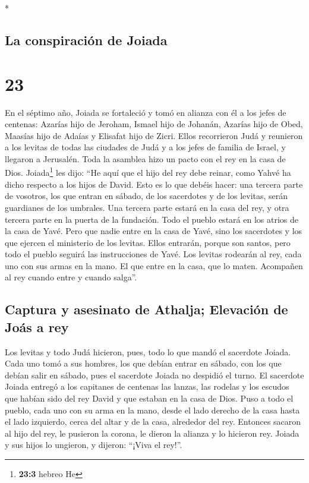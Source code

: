 \begin{paracol}{2}
\begin{otherlanguage}{english}
\end{otherlanguage}

\switchcolumn[0]*

\hypertarget{la-conspiraciuxf3n-de-joiada}{%
\subsection{La conspiración de
Joiada}\label{la-conspiraciuxf3n-de-joiada}}

\hypertarget{section-44}{%
\section{23}\label{section-44}}

 En el séptimo año, Joiada se fortaleció y tomó en alianza
con él a los jefes de centenas: Azarías hijo de Jeroham, Ismael hijo de
Johanán, Azarías hijo de Obed, Maasías hijo de Adaías y Elisafat hijo de
Zicri.  Ellos recorrieron Judá y reunieron a los levitas
de todas las ciudades de Judá y a los jefes de familia de Israel, y
llegaron a Jerusalén.  Toda la asamblea hizo un pacto con
el rey en la casa de Dios. Joiada\footnote{\textbf{23:3} hebreo He} les
dijo: ``He aquí que el hijo del rey debe reinar, como Yahvé ha dicho
respecto a los hijos de David.  Esto es lo que debéis
hacer: una tercera parte de vosotros, los que entran en sábado, de los
sacerdotes y de los levitas, serán guardianes de los umbrales.
 Una tercera parte estará en la casa del rey, y otra
tercera parte en la puerta de la fundación. Todo el pueblo estará en los
atrios de la casa de Yavé.  Pero que nadie entre en la
casa de Yavé, sino los sacerdotes y los que ejercen el ministerio de los
levitas. Ellos entrarán, porque son santos, pero todo el pueblo seguirá
las instrucciones de Yavé.  Los levitas rodearán al rey,
cada uno con sus armas en la mano. El que entre en la casa, que lo
maten. Acompañen al rey cuando entre y cuando salga''.

\hypertarget{captura-y-asesinato-de-athalja-elevaciuxf3n-de-jouxe1s-a-rey}{%
\subsection{Captura y asesinato de Athalja; Elevación de Joás a
rey}\label{captura-y-asesinato-de-athalja-elevaciuxf3n-de-jouxe1s-a-rey}}

 Los levitas y todo Judá hicieron, pues, todo lo que mandó
el sacerdote Joiada. Cada uno tomó a sus hombres, los que debían entrar
en sábado, con los que debían salir en sábado, pues el sacerdote Joiada
no despidió el turno.  El sacerdote Joiada entregó a los
capitanes de centenas las lanzas, las rodelas y los escudos que habían
sido del rey David y que estaban en la casa de Dios. 
Puso a todo el pueblo, cada uno con su arma en la mano, desde el lado
derecho de la casa hasta el lado izquierdo, cerca del altar y de la
casa, alrededor del rey.  Entonces sacaron al hijo del
rey, le pusieron la corona, le dieron la alianza y lo hicieron rey.
Joiada y sus hijos lo ungieron, y dijeron: ``¡Viva el rey!''.


\end{paracol}

